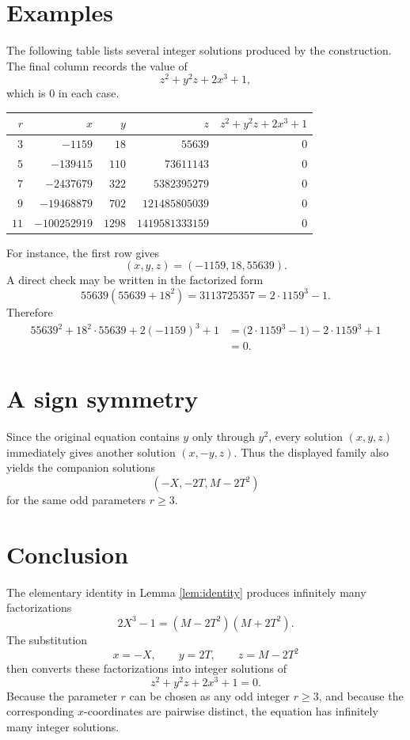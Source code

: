 \documentclass[11pt]{article}
\theoremstyle{remark}
\begin{document}
\section{Examples}

The following table lists several integer solutions produced by the construction.  The final column records the value of
\[
        z^2+y^2z+2x^3+1,
\]
which is \(0\) in each case.

\begin{center}
\begin{tabular}{@{}r r r r r@{}}
\toprule
\(r\) & \(x\) & \(y\) & \(z\) & \(z^2+y^2z+2x^3+1\) \\
\midrule
\(3\)  & \(-1159\)       & \(18\)   & \(55639\)          & \(0\) \\
\(5\)  & \(-139415\)     & \(110\)  & \(73611143\)       & \(0\) \\
\(7\)  & \(-2437679\)    & \(322\)  & \(5382395279\)     & \(0\) \\
\(9\)  & \(-19468879\)   & \(702\)  & \(121485805039\)   & \(0\) \\
\(11\) & \(-100252919\)  & \(1298\) & \(1419581333159\)  & \(0\) \\
\bottomrule
\end{tabular}
\end{center}

For instance, the first row gives
\[
        (x,y,z)=(-1159,18,55639).
\]
A direct check may be written in the factorized form
\[
        55639(55639+18^2)=3113725357=2\cdot 1159^3-1.
\]
Therefore
\begin{align*}
        55639^2+18^2\cdot 55639+2(-1159)^3+1
        &=\bigl(2\cdot 1159^3-1\bigr)-2\cdot1159^3+1 \\
        &=0.
\end{align*}

\section{A sign symmetry}

Since the original equation contains \(y\) only through \(y^2\), every solution \((x,y,z)\) immediately gives another solution \((x,-y,z)\).  Thus the displayed family also yields the companion solutions
\[
        (-X,-2T,M-2T^2)
\]
for the same odd parameters \(r\geq 3\).

\section{Conclusion}

The elementary identity in Lemma \ref{lem:identity} produces infinitely many factorizations
\[
        2X^3-1=(M-2T^2)(M+2T^2).
\]
The substitution
\[
        x=-X,
        \qquad
        y=2T,
        \qquad
        z=M-2T^2
\]
then converts these factorizations into integer solutions of
\[
        z^2+y^2z+2x^3+1=0.
\]
Because the parameter \(r\) can be chosen as any odd integer \(r\geq 3\), and because the corresponding \(x\)-coordinates are pairwise distinct, the equation has infinitely many integer solutions.
\end{document}
